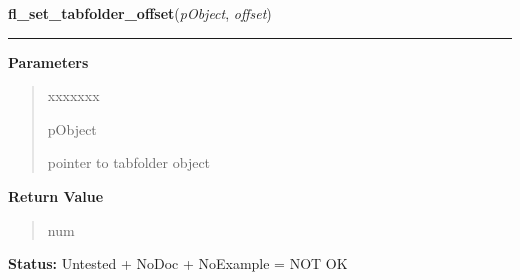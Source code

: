 \hspace{.8\funcindent}\begin{boxedminipage}{\funcwidth}

    \raggedright \textbf{fl\_set\_tabfolder\_offset}(\textit{pObject}, \textit{offset})

    \vspace{-1.5ex}

    \rule{\textwidth}{0.5\fboxrule}
\setlength{\parskip}{2ex}
\setlength{\parskip}{1ex}
      \textbf{Parameters}
      \vspace{-1ex}

      \begin{quote}
        \begin{Ventry}{xxxxxxx}

          \item[pObject]

          pointer to tabfolder object

        \end{Ventry}

      \end{quote}

      \textbf{Return Value}
    \vspace{-1ex}

      \begin{quote}
      num

      \end{quote}

\textbf{Status:} Untested + NoDoc + NoExample = NOT OK



    \end{boxedminipage}

    \label{xformslib:library:fl_create_text}

    \vspace{0.5ex}


